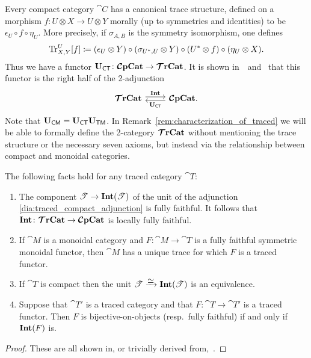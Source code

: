 \documentclass[11pt,oneside,article]{memoir}
\begin{document}
Every compact category $\cat{C}$ has a canonical trace structure, defined on a morphism $f\colon
U\otimes X\to U\otimes Y$ morally (up to symmetries and identities) to be $\epsilon_U\circ f\circ
\eta_U$. More precisely, if $\sigma_{A,B}$ is the symmetry isomorphism, one defines
\begin{equation*}
   \operatorname{Tr}^U_{X,Y}[f]\coloneqq(\epsilon_U\otimes Y)\circ (\sigma_{U^*,U}\otimes Y)\circ (U^*\otimes f)\circ (\eta_U\otimes X).
\end{equation*}
Thus we have a functor $\mathbf{U}_{\mathsf{CT}}\colon\bm{\mathcal{C}}\mathbf{pCat}\to\bm{\mathcal{T}}\mathbf{rCat}$. It is shown in~\cite{JoyalStreetVerity}~and~\cite{HK} that this functor is the right half of the 2-adjunction
\begin{equation}
      \label{dia:traced_compact_adjunction}
   \begin{tikzcd}
      \TTrCat\arrow[r,shift left=.5ex, "\Int"]&\CCompCat\arrow[l,shift left=.5ex,"\UCT"].
   \end{tikzcd}
\end{equation}
Note that $\mathbf{U}_{\mathsf{CM}}=\mathbf{U}_{\mathsf{CT}}\mathbf{U}_{\mathsf{TM}}$. In Remark~\ref{rem:characterization_of_traced} we will be able to formally define the 2-category
$\bm{\mathcal{T}}\mathbf{rCat}$ without mentioning the trace structure or the necessary seven axioms, but instead via the
relationship between compact and monoidal categories.


\begin{lemma}
      \label{lemma:fully_faithful_and_trace}
   The following facts hold for any traced category $\cat{T}$:
   \begin{enumerate}[label={\upshape\roman*}.]
      \item The component $\mathscr{T}\to\mathbf{Int}(\mathscr{T})$ of the unit of the adjunction
         \eqref{dia:traced_compact_adjunction} is fully faithful. It follows that
         $\mathbf{Int}\colon\bm{\mathcal{T}}\mathbf{rCat}\to\bm{\mathcal{C}}\mathbf{pCat}$ is locally fully faithful.
      \item If $\cat{M}$ is a monoidal category and $F\colon\cat{M}\to\cat{T}$ is a fully faithful
         symmetric monoidal functor, then $\cat{M}$ has a unique trace for which $F$ is a traced
         functor.
      \item If $\cat{T}$ is compact then the unit
         $\cat{T}\To{\raisebox{-1ex}{$\equiv$}}\Int(\cat{T})$ is an equivalence.
      \item Suppose that $\cat{T'}$ is a traced category and that $F\colon \cat{T}\to \cat{T}'$ is a
         traced functor. Then $F$ is bijective-on-objects (resp.\ fully faithful) if and only if
         $\mathbf{Int}(F)$ is.
   \end{enumerate}
\end{lemma}
\begin{proof}
   These are all shown in, or trivially derived from,~\cite{JoyalStreetVerity}.
\end{proof}
\end{document}
